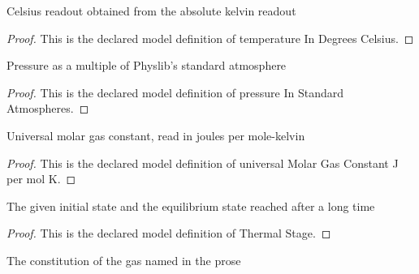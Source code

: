 \begin{definition}
  \label{def:physics:phyx-mini-0406:phyxminiproblems-problemphyxmini0406-temperatureindegreescelsius}
  Celsius readout obtained from the absolute kelvin readout
\end{definition}
\begin{proof}
  This is the declared model definition of temperature In Degrees Celsius.
\end{proof}
\begin{definition}
  \label{def:physics:phyx-mini-0406:phyxminiproblems-problemphyxmini0406-pressureinstandardatmospheres}
  Pressure as a multiple of Physlib's standard atmosphere
\end{definition}
\begin{proof}
  This is the declared model definition of pressure In Standard Atmospheres.
\end{proof}
\begin{definition}
  \label{def:physics:phyx-mini-0406:phyxminiproblems-problemphyxmini0406-universalmolargasconstant-j-per-mol-k}
  Universal molar gas constant, read in joules per mole-kelvin
\end{definition}
\begin{proof}
  This is the declared model definition of universal Molar Gas Constant J per mol K.
\end{proof}
\begin{definition}
  \label{def:physics:phyx-mini-0406:phyxminiproblems-problemphyxmini0406-thermalstage}
  The given initial state and the equilibrium state reached after a long time
\end{definition}
\begin{proof}
  This is the declared model definition of Thermal Stage.
\end{proof}
\begin{definition}
  \label{def:physics:phyx-mini-0406:phyxminiproblems-problemphyxmini0406-gasconstitution}
  The constitution of the gas named in the prose
\end{definition}
